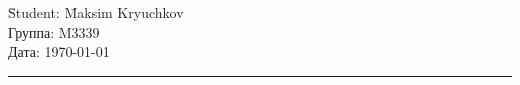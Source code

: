 \begin{tabbing}
\hspace{11cm} \= Student: \= Maksim Kryuchkov \\
  \> Группа: \> M3339 \\
  \> Дата: \> \today
\end{tabbing}
\hrule
\vspace{1cm}

